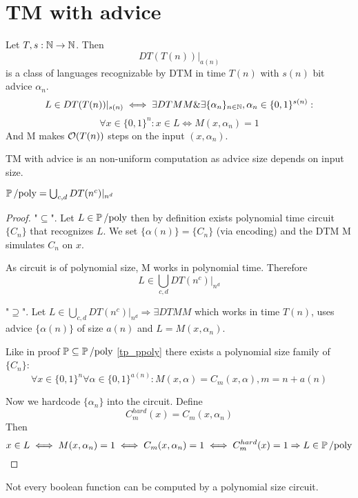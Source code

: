 \section{\texorpdfstring{TM with advice}{TM with advice}}
\vspace{5mm}
\large

\begin{definition}[$DT(T(n))|_{a(n)}$]
	Let $T, s: \operatorname{\mathbb{N}} \to \operatorname{\mathbb{N}}$. Then
	\[ DT(T(n))|_{a(n)} \]
	is a class of languages recognizable by DTM in time $T(n)$ with $s(n)$ bit advice $\alpha_n$.
	\[ L \in DT(T(n))|_{s(n)} \iff \exists DTM M \& \exists \{\alpha_n\}_{n \in \operatorname{\mathbb{N}}}, \alpha_n \in \{ 0, 1 \}^{s(n)}: \]
	\[ \forall x \in \{ 0, 1 \}^n: x \in L \iff M(x, \alpha_n) = 1 \]
	And M makes $\mathcal{O}(T(n))$ steps on the input $(x, \alpha_n)$.
\end{definition}

\begin{note}
	TM with advice is an non-uniform computation as advice size depends on input size.
\end{note}

\begin{theorem}[$\Ppoly$]
	$\operatorname{\operatorname{\mathbb{P}}/poly} = \bigcup_{c, d} DT(n^c)|_{n^d} $
\end{theorem}
\begin{proof}
	"$\subseteq$".
	Let $L \in \operatorname{\operatorname{\mathbb{P}}/poly}$ then by definition exists polynomial time circuit $\{ C_n \}$ that recognizes $L$.
	We set $\{ \alpha(n) \} = \{ C_n \}$ (via encoding) and the DTM M simulates $C_n$ on $x$.

	As circuit is of polynomial size, M works in polynomial time.
	Therefore
	\[ L \in \bigcup_{c, d} DT(n^c)|_{n^d} \]

	"$\supseteq$". Let $L \in \bigcup_{c, d} DT(n^c)|_{n^d} \Rightarrow \exists DTM M$ which works in time $T(n)$, uses advice $\{ \alpha(n) \}$ of size $a(n)$ and $L = M(x, \alpha_n)$.

	Like in proof $\operatorname{\mathbb{P}} \subseteq \operatorname{\operatorname{\mathbb{P}}/poly}$ \cref{tp_ppoly} there exists a polynomial size family of $\{ C_n \}$:
	\[ \forall x \in \{ 0, 1 \}^n \forall \alpha \in \{ 0, 1 \}^{a(n)}: M(x, \alpha) = C_m(x, \alpha), m = n + a(n) \]

	Now we hardcode $\{ \alpha_n \}$ into the circuit.
	Define
	\[ C_m^{hard}(x) = C_m(x, \alpha_n) \]
	Then
	\[ x \in L \iff M(x, \alpha_n) = 1 \iff C_m(x, \alpha_n) = 1 \iff C_m^{hard}(x) = 1 \Rightarrow L \in \operatorname{\operatorname{\mathbb{P}}/poly} \]
\end{proof}

\begin{note}
	Not every boolean function can be computed by a polynomial size circuit.
\end{note}

